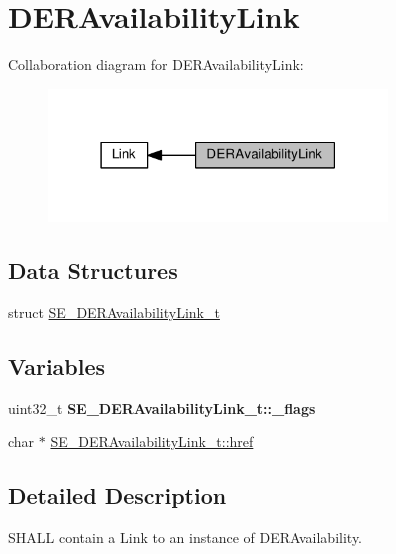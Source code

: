 \hypertarget{group__DERAvailabilityLink}{}\section{D\+E\+R\+Availability\+Link}
\label{group__DERAvailabilityLink}
Collaboration diagram for D\+E\+R\+Availability\+Link\+:\nopagebreak
\begin{figure}[H]
\begin{center}
\leavevmode
\includegraphics[width=255pt]{group__DERAvailabilityLink}
\end{center}
\end{figure}
\subsection*{Data Structures}
\begin{DoxyCompactItemize}
\item 
struct \hyperlink{structSE__DERAvailabilityLink__t}{S\+E\+\_\+\+D\+E\+R\+Availability\+Link\+\_\+t}
\end{DoxyCompactItemize}
\subsection*{Variables}
\begin{DoxyCompactItemize}
\item 
\mbox{\label{group__DERAvailabilityLink_gaacacb168b7a6af207dc0399a7865a708}} 
uint32\+\_\+t {\bfseries S\+E\+\_\+\+D\+E\+R\+Availability\+Link\+\_\+t\+::\+\_\+flags}
\item 
char $\ast$ \hyperlink{group__DERAvailabilityLink_gaa5f882cd5ce06b825c13963b592d969a}{S\+E\+\_\+\+D\+E\+R\+Availability\+Link\+\_\+t\+::href}
\end{DoxyCompactItemize}


\subsection{Detailed Description}
S\+H\+A\+LL contain a Link to an instance of D\+E\+R\+Availability. 

